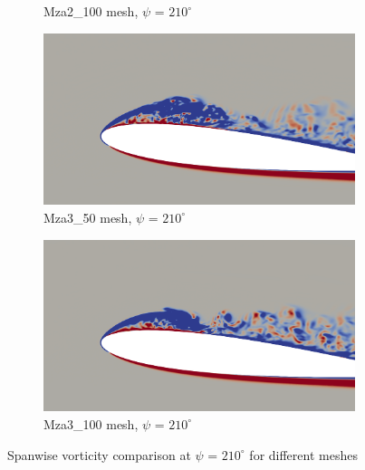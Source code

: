 \begin{figure}[H]
\begin{subfigure}[b]{0.475\textwidth}
		\caption{Mza2\_100 mesh, $\psi$ = $210^\circ$}
		\label{fig:Mza2_100_sp_psi210}
	\end{subfigure}
	\begin{subfigure}[b]{0.475\textwidth}
	\centering
	\includegraphics[width=1\textwidth]{figures/zonal_adapt_results/vorticity_plots/v2/Mza3_50/spavg/phase_210.png}
	\caption{Mza3\_50 mesh, $\psi$ = $210^\circ$}
	\label{fig:Mza3_50_sp_psi210}
\end{subfigure}
	\begin{subfigure}[b]{0.475\textwidth}
		\centering
		\includegraphics[width=1\textwidth]{figures/zonal_adapt_results/vorticity_plots/v2/Mza3_100/spavg/phase_210.png}
		\caption{Mza3\_100 mesh, $\psi$ = $210^\circ$}
		\label{fig:Mza3_100_sp_psi210}
	\end{subfigure}
	\caption{Spanwise vorticity comparison at $\psi$ = $210^\circ$ for different meshes}
	\label{fig:vorticity_zonal_210}
\end{figure}



